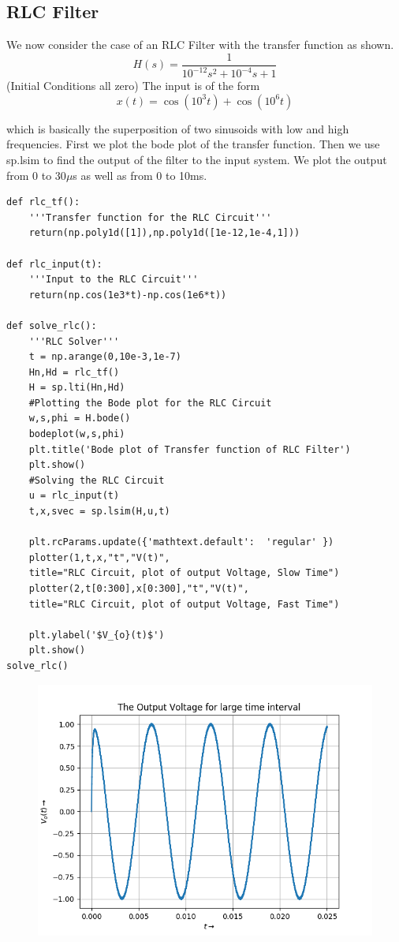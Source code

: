\documentclass[11pt, a4paper]{article}
\begin{document}
\subsection{RLC Filter}
{
We now consider the case of an RLC Filter with the transfer function as shown.
\[ H(s) = \frac{1}{10^{-12}s^2 + 10^{-4}s + 1}\]
(Initial Conditions all zero)
The input is of the form
\[x(t) = \cos{(10^3t)}+\cos{(10^6t)} \]

which is basically the superposition of two sinusoids with low and high frequencies.
First we plot the bode plot of the transfer function.
Then we use sp.lsim to find the output of the filter to the input system.
We plot the output from 0 to 30$\mu$s as well as from 0 to 10ms.
}
\begin{verbatim}
def rlc_tf():
    '''Transfer function for the RLC Circuit'''
    return(np.poly1d([1]),np.poly1d([1e-12,1e-4,1]))

def rlc_input(t):
    '''Input to the RLC Circuit'''
    return(np.cos(1e3*t)-np.cos(1e6*t))

def solve_rlc():
    '''RLC Solver'''
    t = np.arange(0,10e-3,1e-7)
    Hn,Hd = rlc_tf()
    H = sp.lti(Hn,Hd)
    #Plotting the Bode plot for the RLC Circuit
    w,s,phi = H.bode()
    bodeplot(w,s,phi)
    plt.title('Bode plot of Transfer function of RLC Filter')
    plt.show()
    #Solving the RLC Circuit
    u = rlc_input(t)
    t,x,svec = sp.lsim(H,u,t)
    
    plt.rcParams.update({'mathtext.default':  'regular' })
    plotter(1,t,x,"t","V(t)",
    title="RLC Circuit, plot of output Voltage, Slow Time")
    plotter(2,t[0:300],x[0:300],"t","V(t)",
    title="RLC Circuit, plot of output Voltage, Fast Time")

    plt.ylabel('$V_{o}(t)$')
    plt.show()
solve_rlc()

\end{verbatim}
\begin{figure}[!tbh]
   	\centering
   	\includegraphics[scale=0.5]{Figure_6.png}
   	\label{fig:32}
   \end{figure}
\end{document}
